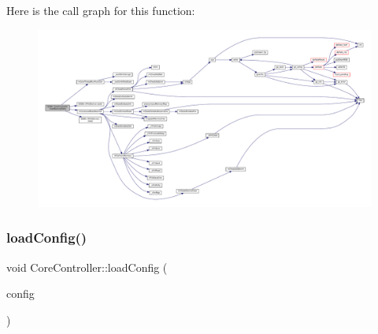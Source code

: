 Here is the call graph for this function\+:
\nopagebreak
\begin{figure}[H]
\begin{center}
\leavevmode
\includegraphics[width=350pt]{class_q_g_b_a_1_1_core_controller_ae3c6183c96ff473cdbdc86132de04ac7_cgraph}
\end{center}
\end{figure}
\mbox{\label{class_q_g_b_a_1_1_core_controller_a9289bc6fcbd0674874ce011528dfd146}} 
\subsubsection{\texorpdfstring{load\+Config()}{loadConfig()}}
{\footnotesize\ttfamily void Core\+Controller\+::load\+Config (\begin{DoxyParamCaption}\item[{\mbox{\hyperlink{class_q_g_b_a_1_1_config_controller}{Config\+Controller}} $\ast$}]{config }\end{DoxyParamCaption})}

